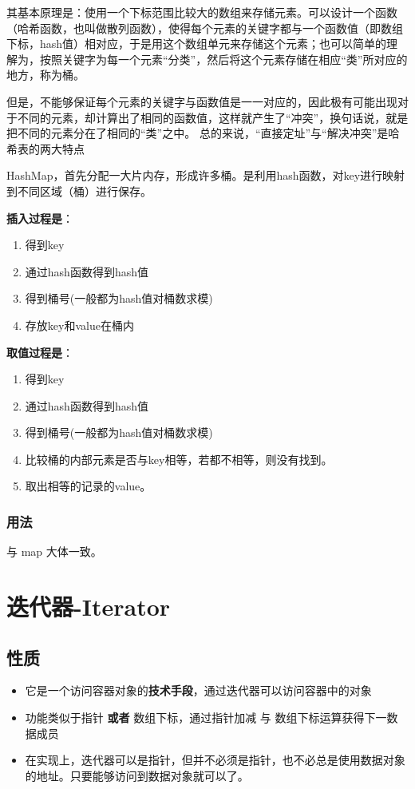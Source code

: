 \documentclass[UTF8,a4paper,12pt]{ctexbook}
\begin{document}
		其基本原理是：使用一个下标范围比较大的数组来存储元素。可以设计一个函数（哈希函数，也叫做散列函数），使得每个元素的关键字都与一个函数值（即数组下标，hash值）相对应，于是用这个数组单元来存储这个元素；也可以简单的理解为，按照关键字为每一个元素“分类”，然后将这个元素存储在相应“类”所对应的地方，称为桶。
		
		但是，不能够保证每个元素的关键字与函数值是一一对应的，因此极有可能出现对于不同的元素，却计算出了相同的函数值，这样就产生了“冲突”，换句话说，就是把不同的元素分在了相同的“类”之中。 总的来说，“直接定址”与“解决冲突”是哈希表的两大特点  
		
		HashMap，首先分配一大片内存，形成许多桶。是利用hash函数，对key进行映射到不同区域（桶）进行保存。
		
		\textbf{插入过程是}：
			\begin{enumerate}[itemindent = 1em]
				\item 得到key
				\item 通过hash函数得到hash值
				\item 得到桶号(一般都为hash值对桶数求模)
				\item 存放key和value在桶内
			\end{enumerate}
		
		\textbf{取值过程是}：
			\begin{enumerate}[itemindent = 1em]
				\item 得到key
				\item 通过hash函数得到hash值
				\item 得到桶号(一般都为hash值对桶数求模)
				\item 比较桶的内部元素是否与key相等，若都不相等，则没有找到。
				\item 取出相等的记录的value。
			\end{enumerate}
	\subsection{用法}
		与 map 大体一致。


\chapter{迭代器-Iterator}
	\section{性质}
		\begin{itemize}
			\item 它是一个访问容器对象的\textbf{技术手段}，通过迭代器可以访问容器中的对象
			\item 功能类似于指针 \textbf{或者}  数组下标，通过指针加减 与 数组下标运算获得下一数据成员

			\item 在实现上，迭代器可以是指针，但并不必须是指针，也不必总是使用数据对象的地址。只要能够访问到数据对象就可以了。
		\end{itemize}
	
\end{document}
